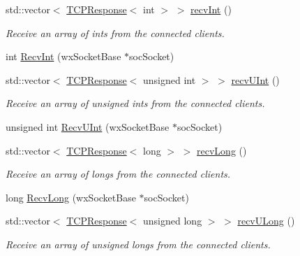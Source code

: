 \begin{DoxyCompactItemize}
\item 
std\+::vector$<$ \hyperlink{class_rad_jav_1_1_networking_1_1_t_c_p_response}{T\+C\+P\+Response}$<$ int $>$ $>$ \hyperlink{class_rad_jav_1_1_networking_1_1wx_widgets_t_c_p_server_a387c5ff774e29e02dc45ed3fbf99969e}{recv\+Int} ()
\begin{DoxyCompactList}\small\item\em Receive an array of ints from the connected clients. \end{DoxyCompactList}\item 
int \hyperlink{class_rad_jav_1_1_networking_1_1wx_widgets_t_c_p_server_a0b52072a020cde47858ca99edff88d90}{Recv\+Int} (wx\+Socket\+Base $\ast$soc\+Socket)
\item 
std\+::vector$<$ \hyperlink{class_rad_jav_1_1_networking_1_1_t_c_p_response}{T\+C\+P\+Response}$<$ unsigned int $>$ $>$ \hyperlink{class_rad_jav_1_1_networking_1_1wx_widgets_t_c_p_server_aee4eefb0ad8336cde044f738a50e3b35}{recv\+U\+Int} ()
\begin{DoxyCompactList}\small\item\em Receive an array of unsigned ints from the connected clients. \end{DoxyCompactList}\item 
unsigned int \hyperlink{class_rad_jav_1_1_networking_1_1wx_widgets_t_c_p_server_ab0ce71a036be2ee1bb6cfc6fe4876436}{Recv\+U\+Int} (wx\+Socket\+Base $\ast$soc\+Socket)
\item 
std\+::vector$<$ \hyperlink{class_rad_jav_1_1_networking_1_1_t_c_p_response}{T\+C\+P\+Response}$<$ long $>$ $>$ \hyperlink{class_rad_jav_1_1_networking_1_1wx_widgets_t_c_p_server_ad7872131a1b3397b5d763748d5300b22}{recv\+Long} ()
\begin{DoxyCompactList}\small\item\em Receive an array of longs from the connected clients. \end{DoxyCompactList}\item 
long \hyperlink{class_rad_jav_1_1_networking_1_1wx_widgets_t_c_p_server_a7e4a4b6bdcbc112191ecd70adf619867}{Recv\+Long} (wx\+Socket\+Base $\ast$soc\+Socket)
\item 
std\+::vector$<$ \hyperlink{class_rad_jav_1_1_networking_1_1_t_c_p_response}{T\+C\+P\+Response}$<$ unsigned long $>$ $>$ \hyperlink{class_rad_jav_1_1_networking_1_1wx_widgets_t_c_p_server_ac87523af47307cfd35bbb9c09f7471f2}{recv\+U\+Long} ()
\begin{DoxyCompactList}\small\item\em Receive an array of unsigned longs from the connected clients. \end{DoxyCompactList}\item 

\end{DoxyCompactItemize}
